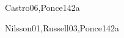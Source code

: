 \begin{syllabus}
\begin{unit}{\ISFundamentalIssues}{}{Castro06,Ponce14}{2}{a}
    \begin{topics}
        \item \ISFundamentalIssuesTopicOverview
        \item \ISFundamentalIssuesTopicWhat
        \item \ISFundamentalIssuesTopicProblem
        \item \ISFundamentalIssuesTopicNature
        \item \ISFundamentalIssuesTopicPhilosophical
    \end{topics}
    \begin{learningoutcomes}
        \item \ISFundamentalIssuesLODescribeTuring [\Usage]
        \item \ISFundamentalIssuesLODeterming [\Usage]
    \end{learningoutcomes}
\end{unit}

\begin{unit}{\ISAgents}{}{Nilsson01,Russell03,Ponce14}{2}{a}
\begin{topics}
    \item \ISAgentsTopicDefinitions
    \item \ISAgentsTopicAgent
    \item \ISAgentsTopicAgentTheory
    \item \ISAgentsTopicRationality
    \item \ISAgentsTopicSoftware
    \item \ISAgentsTopicLearning
    \item \ISAgentsTopicMulti
\end{topics}
\begin{learningoutcomes}
    \item \ISAgentsLOListTheOf [\Usage]
    \item \ISAgentsLOCharacterizeAnd [\Usage]
    \item \ISAgentsLODescribeTheAgent [\Usage]
    \item \ISAgentsLODescribeTheUsed [\Usage]
    \item \ISAgentsLODemonstrateUsingHow [\Usage]
\end{learningoutcomes}
\end{unit}


\end{syllabus}
